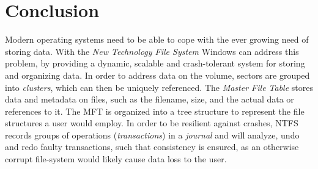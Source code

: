 \section{Conclusion}
Modern operating systems need to be able to cope with the ever growing need of storing data. With the \textit{New Technology File  System} Windows can address this problem, by providing a dynamic, scalable and crash-tolerant system for storing and organizing data.
In order to address data on the volume, sectors are grouped into \textit{clusters}, which can then be uniquely referenced. The \textit{Master File Table} stores data and metadata on files, such as the filename, size, and the actual data or references to it. The MFT is organized into a tree structure to represent the file structures a user would employ. In order to be resilient against crashes, NTFS records groups of operations (\textit{transactions}) in a \textit{journal} and will analyze, undo and redo faulty transactions, such that consistency is ensured, as an otherwise corrupt file-system would likely cause data loss to the user.